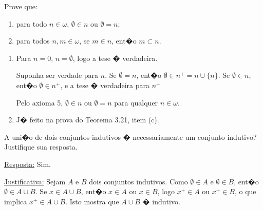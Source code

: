 \begin{exercicio}
	Prove que:
	\begin{enumerate}[label=(\alph{*})]
		\item para todo $n\in\omega$, $\emptyset\in n$ ou $\emptyset=n$;
		\item para todos $n,m\in\omega$, se $m\in n$, ent�o $m\subset n$.
	\end{enumerate}
\end{exercicio}
\begin{solucao}
	\begin{enumerate}[label=(\alph{*})]
		\item Para $n=0$, $n=\emptyset$, logo a tese � verdadeira.
		
		Suponha ser verdade para $n$. Se $\emptyset=n$, ent�o $\emptyset\in n^+=n\cup\{n\}$. Se $\emptyset\in n$, ent�o $\emptyset\in n^+$, e a tese � verdadeira para $n^+$
		
		Pelo axioma 5, $\emptyset\in n$ ou $\emptyset=n$ para qualquer $n\in\omega$.
		\item J� feito na prova do Teorema 3.21, item (c).
	\end{enumerate}
\end{solucao}

\begin{exercicio}
	A uni�o de dois conjuntos indutivos � necessariamente um conjunto indutivo? Justifique sua resposta.
\end{exercicio}
\begin{solucao}
	
	\underline{Resposta:} Sim.
	
	\underline{Justificativa:} Sejam $A$ e $B$ dois conjuntos indutivos. Como $\emptyset\in A$ e $\emptyset\in B$, ent�o $\emptyset\in A\cup B$. Se $x\in A\cup B$, ent�o $x\in A$ ou $x\in B$, logo $x^+\in A$ ou $x^+\in B$, o que implica $x^+\in A\cup B$. Isto mostra que $A\cup B$ � indutivo.
\end{solucao}
